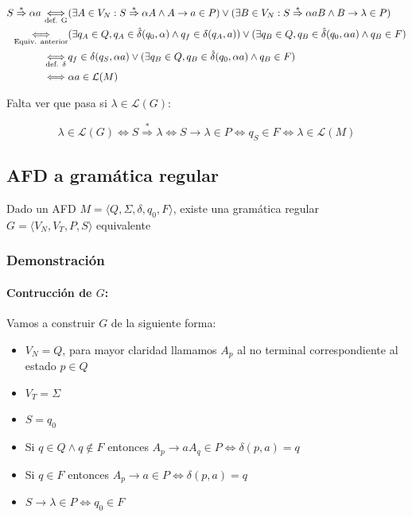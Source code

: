 \begin{align*}
  S\overset{*}{\Rightarrow} \alpha a \underset{\text{def. G}}{\iff} & (\exists A\in V_N: S \overset{*}{\Rightarrow} \alpha A \wedge A \rightarrow a \in P)\lor(\exists B\in V_N: S \overset{*}{\Rightarrow} \alpha aB \wedge B \rightarrow \lambda \in P) \\
  \underset{\text{Equiv. anterior}}{\iff}                           & (\exists q_A\in Q, q_A\in\hat\delta(q_0, \alpha) \land q_f\in\delta(q_A, a)) \lor (\exists q_B\in Q, q_B\in\hat\delta(q_0, \alpha a) \land q_B\in F)                                \\
  \underset{\text{def. \(\delta\)}}{\iff}                           & q_f\in\delta(q_S, \alpha a) \lor (\exists q_B\in Q, q_B\in\hat\delta(q_0, \alpha a) \land q_B\in F)                                                                                 \\
  \iff                                             & \alpha a \in \mathcal{L}(M)                                                                                                                                                         \\
\end{align*}

Falta ver que pasa si \(\lambda\in\mathcal{L}(G)\):

\[ \lambda\in\mathcal{L}(G) \iff S\overset{*}{\Rightarrow} \lambda \iff S\rightarrow \lambda \in P \iff q_S\in F \iff \lambda \in \mathcal{L}(M)\]
\subsection{AFD a gramática regular}
Dado un AFD \(M=\langle Q, \Sigma, \delta, q_0, F\rangle\), existe una gramática regular \(G=\langle V_N, V_T, P, S\rangle\) equivalente

\subsubsection{Demonstración}
\paragraph{Contrucción de \(G\):} Vamos a construir \(G\) de la siguiente forma:
\begin{itemize}
  \item \(V_N = Q\), para mayor claridad llamamos \(A_p\) al no terminal correspondiente al estado \(p\in Q\)
  \item \(V_T = \Sigma\)
  \item \(S = q_0\)
  \item Si \(q\in Q \land q\notin F\) entonces \(A_p \rightarrow aA_q \in P \iff \delta(p,a) = q\)
  \item Si \(q\in F\) entonces \(A_p \rightarrow a \in P \iff \delta(p,a) = q\)
  \item \(S\rightarrow \lambda \in P \iff q_0\in F\)
\end{itemize}

